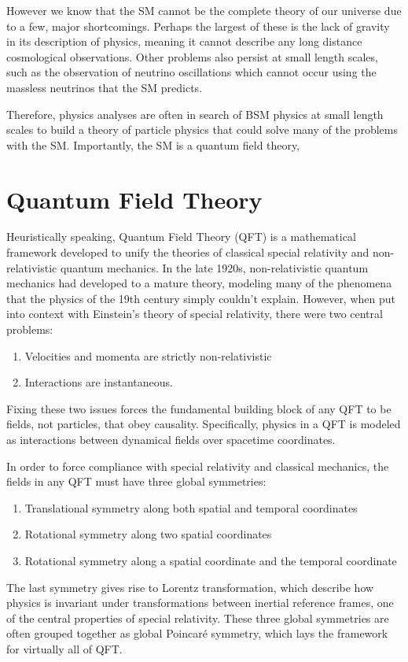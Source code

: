 However we know that the SM cannot be the complete theory of our universe due to a few, major shortcomings. Perhaps the largest of these is the lack of gravity in its description of physics, meaning it cannot describe any long distance cosmological observations. Other problems also persist at small length scales, such as the observation of neutrino oscillations \cite{ref:duan2010collective} which cannot occur using the massless neutrinos that the SM predicts. 

Therefore, physics analyses are often in search of BSM physics at small length scales to build a theory of particle physics that could solve many of the problems with the SM. Importantly, the SM is a quantum field theory, 

\section{Quantum Field Theory \cite{ref:harlow2024}}

Heuristically speaking, Quantum Field Theory (QFT) is a mathematical framework developed to unify the theories of classical special relativity and non-relativistic quantum mechanics. In the late 1920s, non-relativistic quantum mechanics had developed to a mature theory, modeling many of the phenomena that the physics of the 19th century simply couldn't explain. However, when put into context with Einstein's theory of special relativity, there were two central problems: 
\begin{enumerate}
    \item Velocities and momenta are strictly non-relativistic 
    \item Interactions are instantaneous. 
\end{enumerate}
Fixing these two issues forces the fundamental building block of any QFT to be fields, not particles, that obey causality. Specifically, physics in a QFT is modeled as interactions between dynamical fields over spacetime coordinates.

In order to force compliance with special relativity and classical mechanics, the fields in any QFT must have three global symmetries:
\begin{enumerate}
    \item Translational symmetry along both spatial and temporal coordinates
    \item Rotational symmetry along two spatial coordinates
    \item Rotational symmetry along a spatial coordinate and the temporal coordinate
\end{enumerate}
The last symmetry gives rise to Lorentz transformation, which describe how physics is invariant under transformations between inertial reference frames, one of the central properties of special relativity. These three global symmetries are often grouped together as global Poincaré symmetry, which lays the framework for virtually all of QFT.

